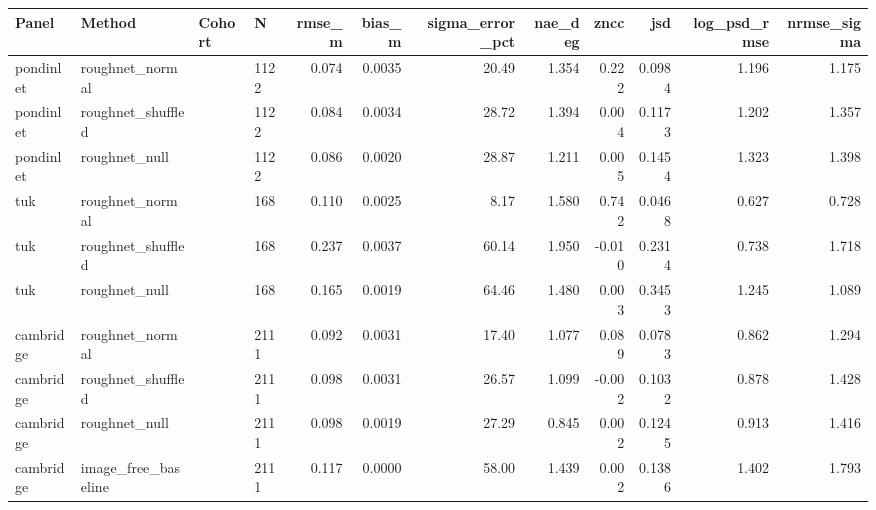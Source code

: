 \begin{tabular}{llllrrrrrrrr}
\hline
Panel & Method & Cohort & N & rmse\_m & bias\_m & sigma\_error\_pct & nae\_deg & zncc & jsd & log\_psd\_rmse & nrmse\_sigma \\
\hline
pondinlet & roughnet\_normal &  & 1122 & 0.074 & 0.0035 & 20.49 & 1.354 & 0.222 & 0.0984 & 1.196 & 1.175 \\
pondinlet & roughnet\_shuffled &  & 1122 & 0.084 & 0.0034 & 28.72 & 1.394 & 0.004 & 0.1173 & 1.202 & 1.357 \\
pondinlet & roughnet\_null &  & 1122 & 0.086 & 0.0020 & 28.87 & 1.211 & 0.005 & 0.1454 & 1.323 & 1.398 \\
tuk & roughnet\_normal &  & 168 & 0.110 & 0.0025 & 8.17 & 1.580 & 0.742 & 0.0468 & 0.627 & 0.728 \\
tuk & roughnet\_shuffled &  & 168 & 0.237 & 0.0037 & 60.14 & 1.950 & -0.010 & 0.2314 & 0.738 & 1.718 \\
tuk & roughnet\_null &  & 168 & 0.165 & 0.0019 & 64.46 & 1.480 & 0.003 & 0.3453 & 1.245 & 1.089 \\
cambridge & roughnet\_normal &  & 2111 & 0.092 & 0.0031 & 17.40 & 1.077 & 0.089 & 0.0783 & 0.862 & 1.294 \\
cambridge & roughnet\_shuffled &  & 2111 & 0.098 & 0.0031 & 26.57 & 1.099 & -0.002 & 0.1032 & 0.878 & 1.428 \\
cambridge & roughnet\_null &  & 2111 & 0.098 & 0.0019 & 27.29 & 0.845 & 0.002 & 0.1245 & 0.913 & 1.416 \\
cambridge & image\_free\_baseline &  & 2111 & 0.117 & 0.0000 & 58.00 & 1.439 & 0.002 & 0.1386 & 1.402 & 1.793 \\
\hline
\end{tabular}
